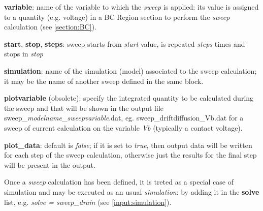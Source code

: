 \begin{itemize}
\textbf{variable}: name of  the  variable to which  the  \textit{sweep} is  applied: its value is assigned to a quantity (e.g. voltage) in a BC Region section to perform the  \textit{sweep} calculation (see  \ref{section:BC}).

\textbf{start}, \textbf{stop}, \textbf{steps}: sweep starts from \textit{start} value, is repeated  \textit{steps} times and stops in \textit{stop}

\textbf{simulation}: name of  the  simulation (model) associated to the  sweep  calculation; it  may  be the  name  of  another sweep defined in the  same block.

\textbf{plotvariable} (obsolete): specify  the  integrated quantity to  be  calculated during the sweep and that will be shown in the output  file 
sweep\_\textit{modelname}\_\textit{sweepvariable}.dat,  eg.  sweep\_driftdiffusion\_Vb.dat  for  a  sweep of  current calculation on the  variable \textit{Vb} (typically a contact voltage).

\textbf{plot\_data}: default is  \textit{false}; if  it is  set  to \textit{true}, then  output data  will be  written for  each  step of the  sweep calculation, otherwise just  the  results  for  the  final step  will  be  present  in  the  output.



Once a \textit{sweep} calculation has  been  defined, it is treted as a special case of  simulation and may be  executed as an usual  \textit{simulation}:
by adding it in the 
\textbf{solve}  list,  e.g.  \textit{solve = sweep\_drain }  (see \ref{input:simulation}).

% 




\end{itemize}
